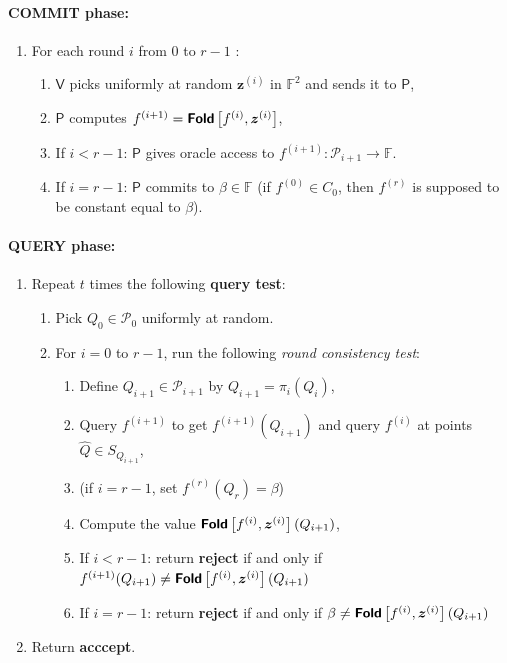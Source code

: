 \documentclass[10pt,a4paper]{article}
\renewcommand\hat{\widehat}
\newcommand\F{\mathbb{F}}
\newcommand\fold[1]{\textsf{\textbf{Fold}}\left[#1\right]}
\renewcommand{\hat}{\widehat}
\newcommand\prover{\mathsf{P}}
\newcommand\verifier{\mathsf{V}}
\renewcommand{\vec}[1]{\boldsymbol{#1}}
\newcommand\bfz{{\vec{z}}}
\newcommand\calP{\mathcal{P}}
\newcommand\xpi[1]{#1^{(i)}}
\newcommand\xpip[1]{#1^{(i+1)}}
\theoremstyle{plain}
\theoremstyle{plain}
\theoremstyle{definition}
\theoremstyle{remark}
\theoremstyle{plain}
\begin{document}
\paragraph*{\textsf{COMMIT} phase:}
\begin{enumerate}
	\item For each round $i$ from 0 to  $r-1$ :
	\begin{enumerate}
		\item $\verifier$ picks uniformly at random $\bfz^{(i)}$ in $\F^2$ and sends it to $\prover$,
		\item $\prover$ computes $\xpip{f} = \fold{\xpi{f}, \xpi{\bfz}}$,
		\item If $i < r - 1$: $\prover$ gives oracle access to $f^{(i + 1)} : \calP_{i + 1} \rightarrow \F$.
		\item If $i = r - 1$: $\prover$ commits to $\beta \in \F$ (if $f^{(0)} \in C_0$, then $f^{(r)}$ is supposed to be constant equal to $\beta$).                
	\end{enumerate}
\end{enumerate}

\paragraph*{\textsf{QUERY} phase:}
\begin{enumerate}
	\item Repeat $t$ times the following \textbf{\textsf{query test}}: 
	\begin{enumerate}
		\item Pick $Q_0 \in \calP_0$ uniformly at random.
		\item For $i = 0$ to $r - 1$, run the following \emph{round consistency test}:
		\begin{enumerate}
			\item Define $Q_{i + 1} \in \calP_{i + 1}$ by $Q_{i + 1} = \pi_i(Q_i)$,
			\item Query $f^{(i+1)}$ to get $f^{(i+1)}(Q_{i+1})$ and query $f^{(i)}$ at points $\hat Q \in S_{Q_{i+1}}$,
			\item[] (if $i = r -1$, set $f^{(r)}(Q_{r}) = \beta$)
			\item Compute the value $\fold{\xpi{f}, \bfz^{(i)}}(Q_{i+1})$,
			\item If $i < r - 1$: return \textsf{\textbf{reject}} if and only if $f^{(i+1)}(Q_{i+1}) \neq \fold{f^{(i)}, \bfz^{(i)}}(Q_{i+1})$
			\item If $i = r - 1$: return \textsf{\textbf{reject}} if and only if $\beta \neq \fold{f^{(i)}, \bfz^{(i)}}(Q_{i+1})$
		\end{enumerate}
	\end{enumerate}
	\item Return \textsf{\textbf{acccept}}. 
\end{enumerate}
\end{document}

